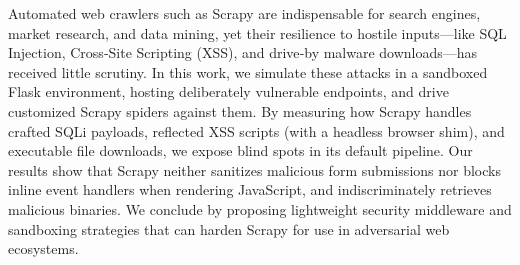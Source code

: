 Automated web crawlers such as Scrapy are indispensable for search engines, market research, and data mining, yet their resilience to hostile inputs—like SQL Injection, Cross‐Site Scripting (XSS), and drive‐by malware downloads—has received little scrutiny. In this work, we simulate these attacks in a sandboxed Flask environment, hosting deliberately vulnerable endpoints, and drive customized Scrapy spiders against them. By measuring how Scrapy handles crafted SQLi payloads, reflected XSS scripts (with a headless browser shim), and executable file downloads, we expose blind spots in its default pipeline. Our results show that Scrapy neither sanitizes malicious form submissions nor blocks inline event handlers when rendering JavaScript, and indiscriminately retrieves malicious binaries. We conclude by proposing lightweight security middleware and sandboxing strategies that can harden Scrapy for use in adversarial web ecosystems.
    